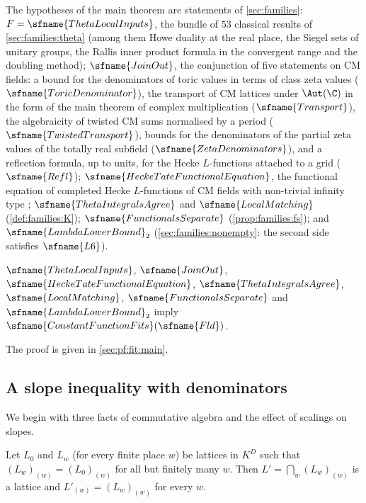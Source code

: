 The hypotheses of the main theorem are statements of \cref{sec:families}: $F=\sfname{ThetaLocalInputs}$, the bundle of
$53$ classical results of \cref{sec:families:theta} (among them Howe duality at the real place, the Siegel sets of
unitary groups, the Rallis inner product formula in the convergent range and the doubling method); $\sfname{JoinOut}$,
the conjunction of five statements on CM fields: a bound for the denominators of toric values in terms of class zeta
values ($\sfname{ToricDenominator}$), the transport of CM lattices under $\Aut(\C)$ in the form of the main theorem of
complex multiplication ($\sfname{Transport}$), the algebraicity of twisted CM sums normalised by a period
($\sfname{TwistedTransport}$), bounds for the denominators of the partial zeta values of the totally real subfield
($\sfname{ZetaDenominators}$), and a reflection formula, up to units, for the Hecke $L$-functions attached to a grid
($\sfname{Refl}$); $\sfname{HeckeTateFunctionalEquation}$, the functional equation of completed Hecke $L$-functions of CM
fields with non-trivial infinity type \cite{Hecke1920,Tate1967thesis}; $\sfname{ThetaIntegralsAgree}$ and
$\sfname{LocalMatching}$ (\cref{def:families:K}); $\sfname{FunctionalsSeparate}$ (\cref{prop:families:fs}); and
$\sfname{LambdaLowerBound}_2$ (\cref{sec:families:nonempty}: the second side satisfies $\sfname{L6}$).

\begin{theorem}\label{pf:fit:main}
$\sfname{ThetaLocalInputs}$, $\sfname{JoinOut}$, $\sfname{HeckeTateFunctionalEquation}$, $\sfname{ThetaIntegralsAgree}$,
$\sfname{LocalMatching}$, $\sfname{FunctionalsSeparate}$ and $\sfname{LambdaLowerBound}_2$ imply
$\sfname{ConstantFunctionFits}(\sfname{Fld})$.
\end{theorem}

The proof is given in \cref{sec:pf:fit:main}.

\subsection{A slope inequality with denominators}\label{sec:pf:fit:slopes}

We begin with three facts of commutative algebra and the effect of scalings on slopes.

\begin{lemma}\label{pf:fit:glue}
Let $L_0$ and $L_w$ (for every finite place $w$) be lattices in $K^D$ such that $(L_w)_{(w)}=(L_0)_{(w)}$ for all but
finitely many $w$. Then $L'=\bigcap_w(L_w)_{(w)}$ is a lattice and $L'_{(w)}=(L_w)_{(w)}$ for every $w$.
\end{lemma}

